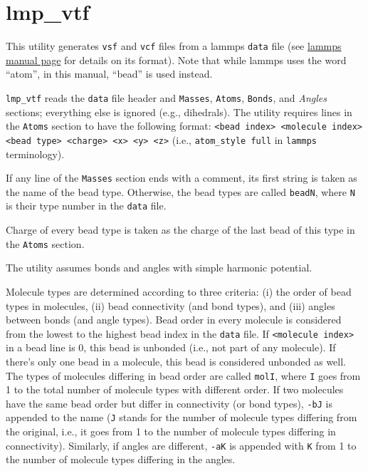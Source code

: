 \section{lmp\_vtf} \label{sec:lmp_vtf}

This utility generates \texttt{vsf} and \texttt{vcf} files from a lammps
\texttt{data} file (see
\href{https://lammps.sandia.gov/doc/read_data.html}{lammps manual page} for
details on its format). Note that while lammps uses the word
\enquote{atom}, in this manual, \enquote{bead} is used instead.

\texttt{lmp\_vtf} reads the \texttt{data} file header and \texttt{Masses},
\texttt{Atoms}, \texttt{Bonds}, and \textit{Angles} sections; everything
else is ignored (e.g., dihedrals). The utility requires lines in the
\texttt{Atoms} section to have the following format: \texttt{<bead index>
<molecule index> <bead type> <charge> <x> <y> <z>} (i.e.,
\texttt{atom\_style full} in \texttt{lammps} terminology).

If any line of the \texttt{Masses} section ends with a comment, its first
string is taken as the name of the bead type. Otherwise, the bead types are
called \texttt{beadN}, where \texttt{N} is their type number in the
\texttt{data} file.

Charge of every bead type is taken as the charge of the last bead of this
type in the \texttt{Atoms} section.

The utility assumes bonds and angles with simple harmonic potential.

Molecule types are determined according to three criteria: (i) the order of
bead types in molecules, (ii) bead connectivity (and bond types), and (iii)
angles between bonds (and angle types). Bead order in every molecule is
considered from the lowest to the highest bead index in the \texttt{data}
file. If \texttt{<molecule index>} in a bead line is 0, this bead is
unbonded (i.e., not part of any molecule). If there's only one bead in a
molecule, this bead is considered unbonded as well. The types of molecules
differing in bead order are called \texttt{molI}, where \texttt{I} goes
from 1 to the total number of molecule types with different order. If two
molecules have the same bead order but differ in connectivity (or bond
types), \texttt{-bJ} is appended to the name (\texttt{J} stands for the
number of molecule types differing from the original, i.e., it goes from 1
to the number of molecule types differing in connectivity). Similarly, if
angles are different, \texttt{-aK} is appended with \texttt{K} from 1 to
the number of molecule types differing in the angles.

